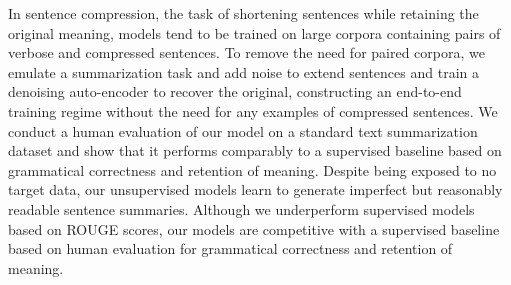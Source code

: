 In sentence compression, the task of shortening sentences while retaining the original meaning, models tend to be trained on large corpora containing pairs of verbose and compressed sentences. To remove the need for paired corpora, we emulate a summarization task and add noise to extend sentences and train a denoising auto-encoder to recover the original, constructing an end-to-end training regime without the need for any examples of compressed sentences. We conduct a human evaluation of our model on a standard text summarization dataset and show that it performs comparably to a supervised baseline based on grammatical correctness and retention of meaning. Despite being exposed to no target data, our unsupervised models learn to generate imperfect but reasonably readable sentence summaries. Although we underperform supervised models based on ROUGE scores, our models are competitive with a supervised baseline based on human evaluation for grammatical correctness and retention of meaning.
